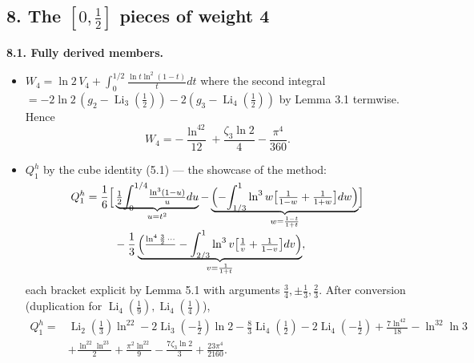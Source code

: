 \documentclass[11pt]{article}
\theoremstyle{remark}
\begin{document}
\subsection*{8. The $[0,\tfrac12]$ pieces of weight 4}

\textbf{8.1. Fully derived members.}
\begin{itemize}
\item $W_4=\ln2\,V_4+\int_0^{1/2}\frac{\ln t\ln^2(1-t)}{t}dt$ where the second integral $=-2\ln2\,(g_2-\operatorname{Li}_3(\tfrac12))-2(g_3-\operatorname{Li}_4(\tfrac12))$ by Lemma 3.1 termwise. Hence
\[
W_4=-\frac{\ln^42}{12}+\frac{\zeta_3\ln2}{4}-\frac{\pi^4}{360}.
\]
\item $Q_1^h$ by the cube identity (5.1) --- the showcase of the method:
\[
\begin{aligned}
Q_1^h=\frac16\Bigl[&\underbrace{\tfrac12\smash{\int_0^{1/4}}\tfrac{\ln^3(1-u)}{u}du}_{u=t^2}
-\underbrace{\Bigl(-\smash{\int_{1/3}^{1}}\ln^3w\bigl[\tfrac1{1-w}+\tfrac1{1+w}\bigr]dw\Bigr)}_{w=\frac{1-t}{1+t}}\Bigr]\\
&-\frac13\underbrace{\Bigl(\tfrac{\ln^4\frac32\,\cdots}{}-\smash{\int_{2/3}^{1}}\ln^3v\bigl[\tfrac1v+\tfrac1{1-v}\bigr]dv\Bigr)}_{v=\frac1{1+t}},
\end{aligned}
\]
each bracket explicit by Lemma 5.1 with arguments $\tfrac34,\pm\tfrac13,\tfrac23$. After conversion (duplication for $\operatorname{Li}_4(\tfrac19),\operatorname{Li}_4(\tfrac14)$),
\[
\begin{aligned}
Q_1^h={}&\operatorname{Li}_2(\tfrac13)\ln^22-2\operatorname{Li}_3(-\tfrac12)\ln2-\frac83\operatorname{Li}_4(\tfrac12)-2\operatorname{Li}_4(-\tfrac12)
+\frac{7\ln^42}{18}-\ln^32\ln3\\
&+\frac{\ln^22\ln^23}{2}+\frac{\pi^2\ln^22}{9}-\frac{7\zeta_3\ln2}{3}+\frac{23\pi^4}{2160}.
\end{aligned}
\]
\end{itemize}
\end{document}

